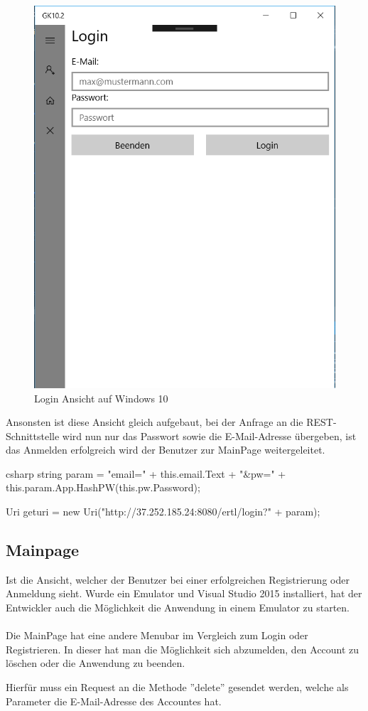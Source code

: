 \begin{figure}[H]
	\centering
	\includegraphics[width=0.5\linewidth]{images/screenshot005}
	\caption{Login Ansicht auf Windows 10}
	\label{fig:screenshot005}
\end{figure}

Ansonsten ist diese Ansicht gleich aufgebaut, bei der Anfrage an die REST-Schnittstelle wird nun nur das Passwort sowie die E-Mail-Adresse übergeben, ist das Anmelden erfolgreich wird der Benutzer zur MainPage weitergeleitet.

\begin{code}{csharp}
	string param = "email=" + this.email.Text + "&pw=" + this.param.App.HashPW(this.pw.Password);
	
	Uri geturi = new Uri("http://37.252.185.24:8080/ertl/login?" + param);
\end{code}

\subsection{Mainpage}

Ist die Ansicht, welcher der Benutzer bei einer erfolgreichen Registrierung oder Anmeldung sieht. Wurde ein Emulator und Visual Studio 2015 installiert, hat der Entwickler auch die Möglichkeit die Anwendung in einem Emulator zu starten.
\\\\
Die MainPage hat eine andere Menubar im Vergleich zum Login oder Registrieren. In dieser hat man die Möglichkeit sich abzumelden, den Account zu löschen oder die Anwendung zu beenden.

Hierfür muss ein Request an die Methode ''delete'' gesendet werden, welche als Parameter die E-Mail-Adresse des Accountes hat.

